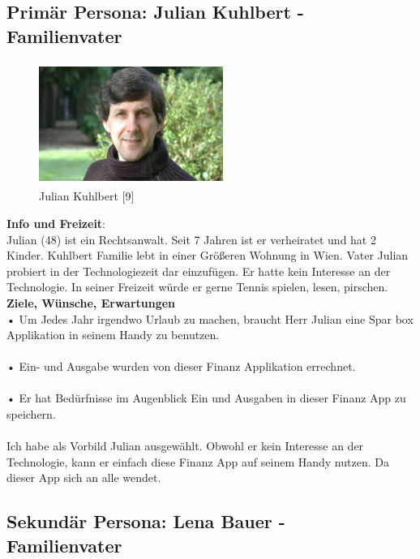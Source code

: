 \documentclass[runningheads,a4paper]{llncs}
\begin{document}
\clearpage

\subsection{Primär Persona: Julian Kuhlbert - \\Familienvater}

\begin{figure}
\centering
\includegraphics[height=4cm,width=6cm]{juliankuhlberg}
\caption{Julian Kuhlbert [9]}

\end{figure}
                                          
\textbf{Info und Freizeit}: \\
Julian (48) ist ein Rechtsanwalt. Seit 7 Jahren ist er verheiratet und hat 2 Kinder. Kuhlbert Familie lebt in einer Größeren Wohnung in Wien. Vater Julian probiert in der Technologiezeit dar einzufügen. Er hatte kein Interesse an der Technologie.
In seiner Freizeit würde er gerne Tennis spielen, lesen, pirschen.\\


\textbf{ Ziele, Wünsche, Erwartungen}\\

• Um Jedes Jahr irgendwo Urlaub zu machen, braucht Herr Julian eine Spar box Applikation in seinem Handy zu benutzen.\\\\
• Ein- und Ausgabe wurden von dieser Finanz Applikation errechnet. \\\\
• Er hat Bedürfnisse im Augenblick Ein und Ausgaben in dieser Finanz App zu speichern.\\\\
  Ich habe als Vorbild Julian ausgewählt. Obwohl er kein Interesse an der Technologie, kann er einfach diese Finanz App auf seinem Handy nutzen. Da dieser App sich an alle wendet.\\


\clearpage


\subsection{Sekundär Persona: Lena Bauer - \\Familienvater}
\end{document}
